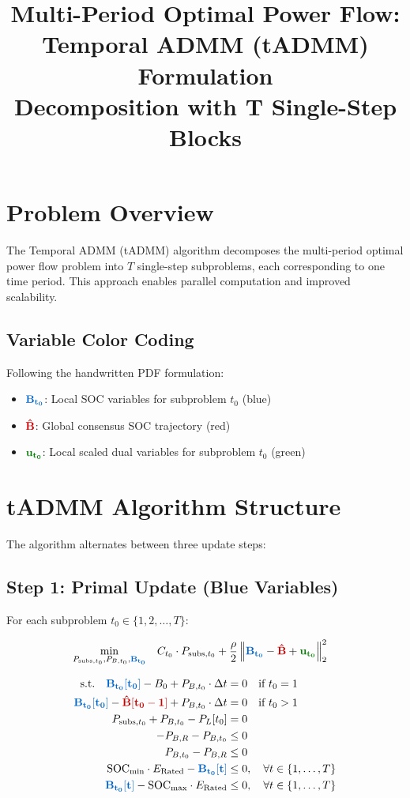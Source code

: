 \documentclass[11pt]{article}
\title{Multi-Period Optimal Power Flow:\\Temporal ADMM (tADMM) Formulation\\[0.5em] \large Decomposition with T Single-Step Blocks}
\author{}
\date{}
\newcommand{\blueB}[1]{\textcolor{bluevar}{\mathbf{#1}}}      %
\newcommand{\redBhat}[1]{\textcolor{redvar}{\mathbf{#1}}}     %
\newcommand{\greenu}[1]{\textcolor{greenvar}{\mathbf{#1}}}    %
\begin{document}
\maketitle

\section{Problem Overview}

The Temporal ADMM (tADMM) algorithm decomposes the multi-period optimal power flow problem into $T$ single-step subproblems, each corresponding to one time period. This approach enables parallel computation and improved scalability.

\subsection{Variable Color Coding}
Following the handwritten PDF formulation:
\begin{itemize}
    \item $\blueB{B_{t_0}}$: Local SOC variables for subproblem $t_0$ (blue)
    \item $\redBhat{\hat{B}}$: Global consensus SOC trajectory (red)
    \item $\greenu{u_{t_0}}$: Local scaled dual variables for subproblem $t_0$ (green)
\end{itemize}

\section{tADMM Algorithm Structure}

The algorithm alternates between three update steps:

\subsection{Step 1: Primal Update (Blue Variables)}
For each subproblem $t_0 \in \{1, 2, \ldots, T\}$:

\begin{align}
\min_{P_{\text{subs},t_0}, P_{B,t_0}, \blueB{B_{t_0}}} \quad & C_{t_0} \cdot P_{\text{subs},t_0} + \frac{\rho}{2} \left\| \blueB{B_{t_0}} - \redBhat{\hat{B}} + \greenu{u_{t_0}} \right\|_2^2
\end{align}

\begin{align}
\text{s.t.} \quad \blueB{B_{t_0}[t_0]} - B_0 + P_{B,t_0} \cdot \Delta t &= 0 \quad \text{if } t_0 = 1 \\
\blueB{B_{t_0}[t_0]} - \redBhat{\hat{B}[t_0-1]} + P_{B,t_0} \cdot \Delta t &= 0 \quad \text{if } t_0 > 1 \\
P_{\text{subs},t_0} + P_{B,t_0} - P_L[t_0] &= 0 \\
-P_{B,R} - P_{B,t_0} &\leq 0 \\
P_{B,t_0} - P_{B,R} &\leq 0 \\
\text{SOC}_{\min} \cdot E_{\text{Rated}} - \blueB{B_{t_0}[t]} &\leq 0, \quad \forall t \in \{1, \ldots, T\} \\
\blueB{B_{t_0}[t]} - \text{SOC}_{\max} \cdot E_{\text{Rated}} &\leq 0, \quad \forall t \in \{1, \ldots, T\}
\end{align}
\end{document}
